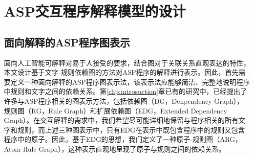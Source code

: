 \chapter{ASP交互程序解释模型的设计}
\section{面向解释的ASP程序图表示}
面向人工智能可解释对易于人接受的要求，结合图对于关联关系直观表达的特性，本文设计基于文字-规则依赖图的方法对ASP程序的解释进行表示。因此，首先需要定义一种面向解释的ASP程序图表示法，该表示法应能够简洁、完整地说明程序中规则和文字之间的依赖关系。第\ref{chp:introsuction}章已有的研究中，已经提出了许多与ASP程序相关的图表示方法，包括依赖图（DG，Denpendency Graph）\cite{apt1994logic}，规则图（RG，Rule Graph）\cite{dimopoulos1996graph}和扩展依赖图（EDG，Extended Dependency Graph）\cite{brignoli2014characterizing}。在交互解释的需求中，我们希望尽可能详细地保留与程序相关的所有文字和规则，而上述三种图表示中，只有EDG在表示中既包含程序中的规则又包含程序中的原子。因此，基于EDG的思想，我们定义了一种原子-规则图（ARG，Atom-Rule Graph），这种表示直观地呈现了原子与规则之间的依赖关系。

